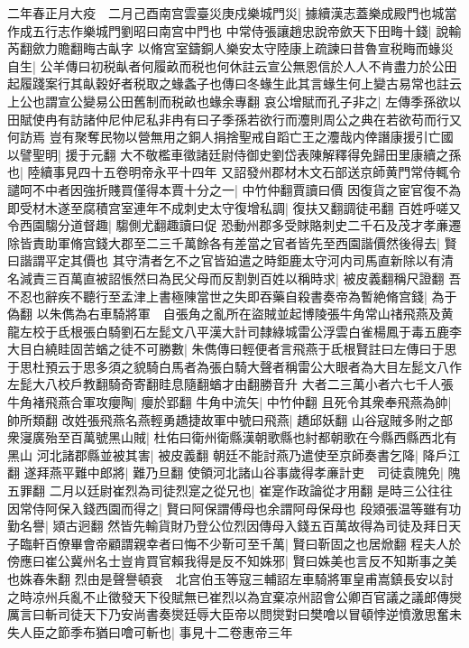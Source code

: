 二年春正月大疫　二月己酉南宫雲臺災庚戍樂城門災|{
	據續漢志蓋樂成殿門也城當作成五行志作樂城門劉昭曰南宫中門也}
中常侍張讓趙忠說帝歛天下田畮十錢|{
	說輸芮翻歛力贍翻畮古畒字}
以脩宫室鑄銅人樂安太守陸康上疏諫曰昔魯宣税畮而蝝災自生|{
	公羊傳曰初税畒者何履畝而税也何休註云宣公無恩信於人人不肯盡力於公田起履踐案行其畒穀好者税取之蝝螽子也傳曰冬蝝生此其言蝝生何上變古易常也註云上公也謂宣公變易公田舊制而税畝也蝝余專翻}
哀公增賦而孔子非之|{
	左傳季孫欲以田賦使冉有訪諸仲尼仲尼私非冉有曰子季孫若欲行而灋則周公之典在若欲苟而行又何訪焉}
豈有聚奪民物以營無用之銅人捐捨聖戒自蹈亡王之灋哉内倖譖康援引亡國以譬聖明|{
	援于元翻}
大不敬檻車徵諸廷尉侍御史劉岱表陳解釋得免歸田里康續之孫也|{
	陸續事見四十五卷明帝永平十四年}
又詔發州郡材木文石部送京師黄門常侍輒令譴呵不中者因強折賤買僅得本賈十分之一|{
	中竹仲翻賈讀曰價}
因復貨之宦官復不為即受材木遂至腐積宫室連年不成刺史太守復增私調|{
	復扶又翻調徒弔翻}
百姓呼嗟又令西園騶分道督趣|{
	騶側尤翻趣讀曰促}
恐動州郡多受賕賂刺史二千石及茂才孝亷遷除皆責助軍脩宫錢大郡至二三千萬餘各有差當之官者皆先至西園諧價然後得去|{
	賢曰諧謂平定其價也}
其守清者乞不之官皆廹遣之時鉅鹿太守河内司馬直新除以有清名減責三百萬直被詔悵然曰為民父母而反割剝百姓以稱時求|{
	被皮義翻稱尺證翻}
吾不忍也辭疾不聽行至孟津上書極陳當世之失即吞藥自殺書奏帝為暫絶脩宫錢|{
	為于偽翻}
以朱儁為右車騎將軍　自張角之亂所在盜賊並起博陵張牛角常山禇飛燕及黄龍左校于氐根張白騎劉石左髭文八平漢大計司隸綠城雷公浮雲白雀楊鳳于毒五鹿李大目白繞眭固苦蝤之徒不可勝數|{
	朱儁傳曰輕便者言飛燕于氐根賢註曰左傳曰于思于思杜預云于思多須之貌騎白馬者為張白騎大聲者稱雷公大眼者為大目左髭文八作左髭大八校戶教翻騎奇寄翻眭息隨翻蝤才由翻勝音升}
大者二三萬小者六七千人張牛角褚飛燕合軍攻癭陶|{
	癭於郢翻}
牛角中流矢|{
	中竹仲翻}
且死令其衆奉飛燕為帥|{
	帥所類翻}
改姓張飛燕名燕輕勇趫捷故軍中號曰飛燕|{
	趫邱妖翻}
山谷寇賊多附之部衆寖廣殆至百萬號黑山賊|{
	杜佑曰衛州衛縣漢朝歌縣也紂都朝歌在今縣西縣西北有黑山}
河北諸郡縣並被其害|{
	被皮義翻}
朝廷不能討燕乃遣使至京師奏書乞降|{
	降戶江翻}
遂拜燕平難中郎將|{
	難乃旦翻}
使領河北諸山谷事歲得孝亷計吏　司徒袁隗免|{
	隗五罪翻}
二月以廷尉崔烈為司徒烈寔之從兄也|{
	崔寔作政論從才用翻}
是時三公往往因常侍阿保入錢西園而得之|{
	賢曰阿保謂傅母也余謂阿母保母也}
段熲張温等雖有功勤名譽|{
	熲古迥翻}
然皆先輸貨財乃登公位烈因傳母入錢五百萬故得為司徒及拜日天子臨軒百僚畢會帝顧謂親幸者曰悔不少靳可至千萬|{
	賢曰靳固之也居焮翻}
程夫人於傍應曰崔公冀州名士豈肯買官賴我得是反不知姝邪|{
	賢曰姝美也言反不知斯事之美也姝春朱翻}
烈由是聲譽頓衰　北宫伯玉等寇三輔詔左車騎將軍皇甫嵩鎮長安以討之時凉州兵亂不止徵發天下役賦無已崔烈以為宜棄凉州詔會公卿百官議之議郎傳爕厲言曰斬司徒天下乃安尚書奏爕廷辱大臣帝以問爕對曰樊噲以冒頓悖逆憤激思奮未失人臣之節季布猶曰噲可斬也|{
	事見十二卷惠帝三年}
